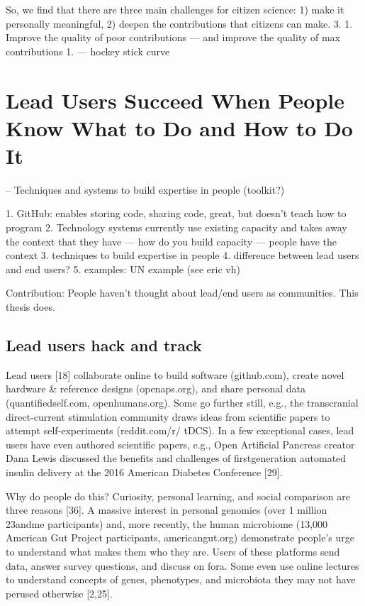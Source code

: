 So, we find that there are three main challenges for citizen science: 1) make it personally meaningful, 2) deepen the contributions that citizens can make.
3. 1. Improve the quality of poor contributions — and improve the quality of max contributions 
    1. — hockey stick curve 



\section{Lead Users Succeed When People Know What to Do and How to Do It}
-- Techniques and systems to build expertise in people (toolkit?)

1. GitHub: enables storing code, sharing code, great, but doesn’t teach how to program
2. Technology systems currently use existing capacity and takes away the context that they have — how do you build capacity — people have the context 
3. techniques to build expertise in people
4. difference between lead users and end users? 
5. examples: UN example (see eric vh)

Contribution: People haven't thought about lead/end users as communities. This thesis does.
\subsection{Lead users hack and track}
Lead users [18] collaborate online to build software
(github.com), create novel hardware \& reference designs
(openaps.org), and share personal data (quantifiedself.com,
openhumans.org). Some go further still, e.g., the transcranial
direct-current stimulation community draws ideas from scientific
papers to attempt self-experiments (reddit.com/r/
tDCS). In a few exceptional cases, lead users have even authored
scientific papers, e.g., Open Artificial Pancreas creator
Dana Lewis discussed the benefits and challenges of firstgeneration
automated insulin delivery at the 2016 American
Diabetes Conference [29].

Why do people do this? Curiosity, personal learning, and social
comparison are three reasons [36]. A massive interest in
personal genomics (over 1 million 23andme participants)
and, more recently, the human microbiome (13,000 American
Gut Project participants, americangut.org) demonstrate
people’s urge to understand what makes them who they are.
Users of these platforms send data, answer survey questions,
and discuss on fora. Some even use online lectures to understand
concepts of genes, phenotypes, and microbiota they
may not have perused otherwise [2,25].

